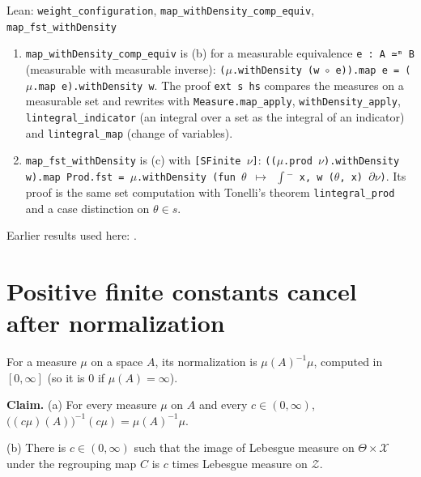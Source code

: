\documentclass[11pt,a4paper]{article}
\begin{document}
\begin{leanbox}{Lean: \texttt{weight\_\allowbreak{}configuration}, \texttt{map\_\allowbreak{}withDensity\_\allowbreak{}comp\_\allowbreak{}equiv}, \texttt{map\_\allowbreak{}fst\_\allowbreak{}withDensity}}
\begin{enumerate}
\item \texttt{map\_\allowbreak{}with\allowbreak{}Density\_\allowbreak{}comp\_\allowbreak{}equiv} is (b) for a measurable equivalence \texttt{e : A ≃ᵐ B} (measurable with measurable inverse): \texttt{(\ensuremath{\mu}.\allowbreak{}with\allowbreak{}Density (w \ensuremath{\circ} e)).\allowbreak{}map e = (\ensuremath{\mu}.\allowbreak{}map e).\allowbreak{}with\allowbreak{}Density w}. The proof \texttt{ext s hs} compares the measures on a measurable set and rewrites with \texttt{Measure.\allowbreak{}map\_\allowbreak{}apply}, \texttt{with\allowbreak{}Density\_\allowbreak{}apply}, \texttt{lintegral\_\allowbreak{}indicator} (an integral over a set as the integral of an indicator) and \texttt{lintegral\_\allowbreak{}map} (change of variables).

\item \texttt{map\_\allowbreak{}fst\_\allowbreak{}with\allowbreak{}Density} is (c) with \texttt{[SFinite \ensuremath{\nu}]}: \texttt{((\ensuremath{\mu}.\allowbreak{}prod \ensuremath{\nu}).\allowbreak{}with\allowbreak{}Density w).\allowbreak{}map Prod.\allowbreak{}fst = \ensuremath{\mu}.\allowbreak{}with\allowbreak{}Density (fun \ensuremath{\theta} \ensuremath{\mapsto} \ensuremath{\int}\ensuremath{{}^{-}} x, w (\ensuremath{\theta}, x) \ensuremath{\partial}\ensuremath{\nu})}. Its proof is the same set computation with Tonelli's theorem \texttt{lintegral\_\allowbreak{}prod} and a case distinction on \(\theta\in s\).

\end{enumerate}
\end{leanbox}


Earlier results used here: \cite[Section~3.26.1]{LangevinLean2026ULASC}.

\section{\texorpdfstring{Positive finite constants cancel after normalization}{Positive finite constants cancel after normalization}}


For a measure \(\mu\) on a space \(A\), its normalization is \(\mu(A)^{-1}\mu\), computed in \([0,\infty]\) (so it is \(0\) if \(\mu(A)=\infty\)).




\textbf{Claim.} (a) For every measure \(\mu\) on \(A\) and every \(c\in(0,\infty)\), \(\bigl((c\mu)(A)\bigr)^{-1}(c\mu)=\mu(A)^{-1}\mu\).




(b) There is \(c\in(0,\infty)\) such that the image of Lebesgue measure on \(\Theta\times\mathcal X\) under the regrouping map \(C\) is \(c\) times Lebesgue measure on \(\mathcal Z\).
\end{document}
